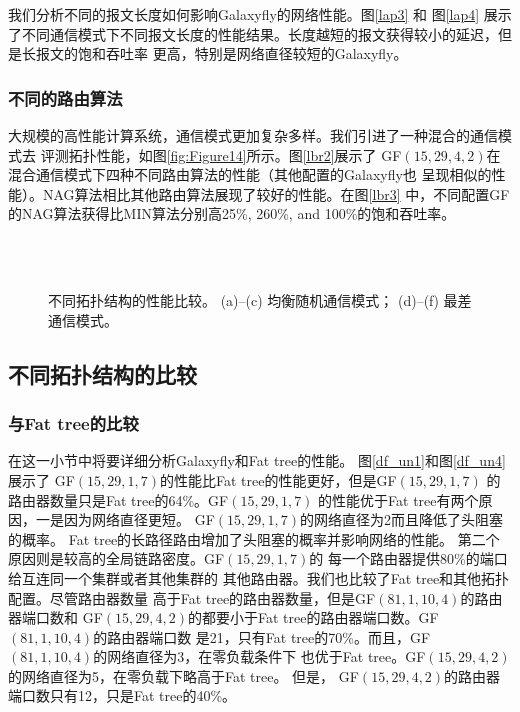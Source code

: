 我们分析不同的报文长度如何影响Galaxyfly的网络性能。图\ref{lap3} 和
图\ref{lap4}
展示了不同通信模式下不同报文长度的性能结果。长度越短的报文获得较小的延迟，但是长报文的饱和吞吐率
更高，特别是网络直径较短的Galaxyfly。

\subsubsection{不同的路由算法}

大规模的高性能计算系统，通信模式更加复杂多样。我们引进了一种混合的通信模式去
评测拓扑性能，如图\ref{fig:Figure14}所示。图\ref{lbr2}展示了
GF$(15,29,4,2)$在混合通信模式下四种不同路由算法的性能（其他配置的Galaxyfly也
呈现相似的性能）。NAG算法相比其他路由算法展现了较好的性能。在图\ref{lbr3}
中，不同配置GF的NAG算法获得比MIN算法分别高25\%, 260\%, and 100\%的饱和吞吐率。

\begin{figure}[t]
  \centering
  \begin{minipage}[t]{\textwidth}
   \centering
    \\
    \\
  \caption{不同拓扑结构的性能比较。 (a)--(c) 均衡随机通信模式； (d)--(f) 最差通信模式。}
  \label{fig:Figure11}
  \end{minipage}
\end{figure}

\subsection{不同拓扑结构的比较}

\subsubsection{与Fat tree的比较}
在这一小节中将要详细分析Galaxyfly和Fat tree的性能。
图\ref{df_un1}和图\ref{df_un4}展示了
GF$(15,29,1,7)$的性能比Fat tree的性能更好，但是GF$(15,29,1,7)$
的路由器数量只是Fat tree的64\%。GF$(15,29,1,7)$
的性能优于Fat tree有两个原因，一是因为网络直径更短。
GF$(15,29,1,7)$的网络直径为2而且降低了头阻塞的概率。
Fat tree的长路径路由增加了头阻塞的概率并影响网络的性能。
第二个原因则是较高的全局链路密度。GF$(15,29,1,7)$的
每一个路由器提供80\%的端口给互连同一个集群或者其他集群的
其他路由器。我们也比较了Fat tree和其他拓扑配置。尽管路由器数量
高于Fat tree的路由器数量，但是GF$(81,1,10,4)$的路由器端口数和
GF$(15,29,4,2)$的都要小于Fat tree的路由器端口数。GF$(81,1,10,4)$的路由器端口数
是21，只有Fat tree的70\%。而且，GF$(81,1,10,4)$的网络直径为3，在零负载条件下
也优于Fat tree。GF$(15,29,4,2)$的网络直径为5，在零负载下略高于Fat tree。 但是，
GF$(15,29,4,2)$的路由器端口数只有12，只是Fat tree的40\%。

